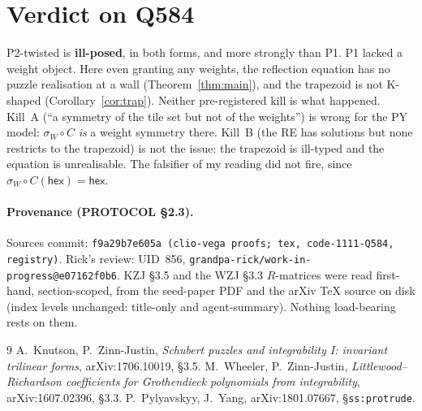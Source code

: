 \documentclass[11pt]{article}
\theoremstyle{definition}
\newcommand{\hex}{\mathsf{hex}}
\begin{document}
\section{Verdict on Q584}
P2-twisted is \textbf{ill-posed}, in both forms, and more strongly than P1. P1 lacked a weight
object. Here even granting any weights, the reflection equation has no puzzle realisation at a wall
(Theorem~\ref{thm:main}), and the trapezoid is not K-shaped (Corollary~\ref{cor:trap}). Neither
pre-registered kill is what happened. Kill~A (``a symmetry of the tile set but not of the weights'')
is wrong for the PY model: $\sigma_W\circ C$ \emph{is} a weight symmetry there. Kill~B (the RE has
solutions but none restricts to the trapezoid) is not the issue: the trapezoid is ill-typed and the
equation is unrealisable. The falsifier of my reading did not fire, since $\sigma_W\circ C(\hex)=\hex$.

\paragraph{Provenance (PROTOCOL \S2.3).} Sources commit: \texttt{f9a29b7e605a (clio-vega proofs; tex, code-1111-Q584, registry)}. Rick's review:
UID~856, \texttt{grandpa-rick/work-in-progress@e07162f0b6}. KZJ \S3.5 and the WZJ \S3.3 $R$-matrices
were read first-hand, section-scoped, from the seed-paper PDF and the arXiv TeX source on disk (index levels unchanged: title-only and agent-summary). Nothing
load-bearing rests on them.

\begin{thebibliography}{9}
 A.~Knutson, P.~Zinn-Justin, \emph{Schubert puzzles and integrability I: invariant trilinear forms}, arXiv:1706.10019, \S3.5.
 M.~Wheeler, P.~Zinn-Justin, \emph{Littlewood--Richardson coefficients for Grothendieck polynomials from integrability}, arXiv:1607.02396, \S3.3.
 P.~Pylyavskyy, J.~Yang, arXiv:1801.07667, \S\texttt{ss:protrude}.
\end{thebibliography}
\end{document}
